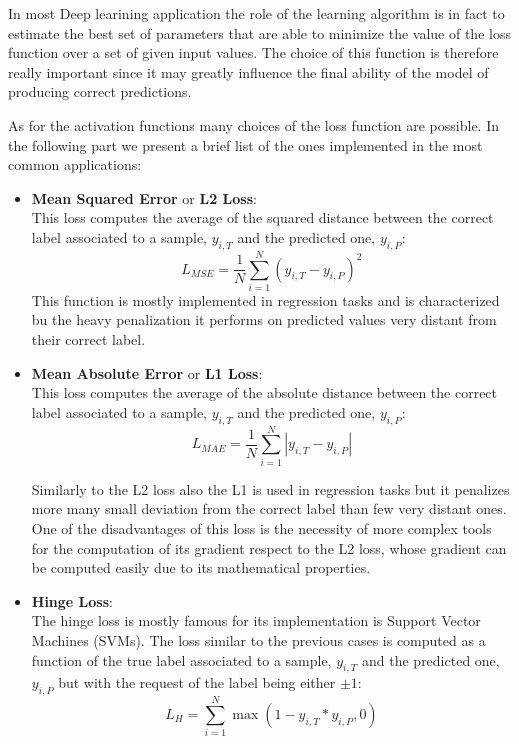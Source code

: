 In most Deep learining application the role of the learning algorithm is in fact to estimate the best set of parameters that are able to minimize the value of the loss function over a set of given input values. The choice of this function is therefore really important since it may greatly influence the final ability of the model of producing correct predictions.

As for the activation functions many choices of the loss function are possible. In the following part we present a brief list of the ones implemented in the most common applications:
\begin{itemize}
    \item \textbf{Mean Squared Error} or \textbf{L2 Loss}:\\
    This loss computes the average of the squared distance between the correct label associated to a sample, $y_{i,T}$ and the predicted one, $y_{i,P}$:
    \begin{equation}
        L_{MSE}= \frac{1}{N}\sum_{i=1}^N \left(y_{i,T}-y_{i,P}\right)^2
    \end{equation}
    This function is mostly implemented in regression tasks and is characterized bu the heavy penalization it performs on predicted values very distant from their correct label.
    
    \item \textbf{Mean Absolute Error} or \textbf{L1 Loss}:\\
    This loss computes the average of the absolute distance between the correct label associated to a sample, $y_{i,T}$ and the predicted one, $y_{i,P}$:
    \begin{equation}
        L_{MAE}= \frac{1}{N}\sum_{i=1}^N \left|y_{i,T}-y_{i,P}\right|
    \end{equation}
    
    Similarly to the L2 loss also the L1 is used in regression tasks but it penalizes more many small deviation from the correct label than few very distant ones. One of the disadvantages of this loss is the necessity of more complex tools for the computation of its gradient respect to the L2 loss, whose gradient can be computed easily due to its mathematical properties.

\item \textbf{Hinge Loss}:\\
    The hinge loss is mostly famous for its implementation is Support Vector Machines (SVMs). The loss similar to the previous cases is computed as a function of the true label  associated to a sample, $y_{i,T}$ and the predicted one, $y_{i,P}$ but with the request of the label being either $\pm 1$:
    \begin{equation}
        L_{H}= \sum_{i=1}^N \max\left( 1-y_{i,T}*y_{i,P},0\right)
    \end{equation}
    

\end{itemize}
